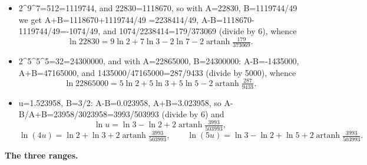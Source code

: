 \documentclass[10pt,reqno]{amsart}
\def\({}\def\){}%
\def\frac#1#2{#1/#2}%
\providecommand{\tightlist}{\setlength{\itemsep}{0pt}\setlength{\parskip}{0pt}}
\theoremstyle{definition}
\theoremstyle{remark}
\begin{document}
\begin{itemize}
\tightlist
\item
  \(2^9^7=512=1119744\), and \(22830=1118670\), so with \(A=22830\), \(B=\frac{1119744}{49}\) we get \(A+B=\frac{1118670+1119744}{49}
  =\frac{2238414}{49}\), \(A-B=\frac{1118670-1119744}{49}=-\frac{1074}{49}\), and \(\frac{1074}{2238414}=\frac{179}{373069}\) (divide by \(6\)), whence \[\ln 22830=9\ln2+7\ln3-2\ln7-2\operatorname{artanh}\tfrac{179}{373069}. \tag{5.5}\]
\item
  \(2^5^5^5=32=24300000\), and with \(A=22865000\), \(B=24300000\): \(A-B=-1435000\), \(A+B=47165000\), and \(\frac{1435000}{47165000}=\frac{287}{9433}\) (divide by \(5000\)), whence \[\ln 22865000=5\ln2+5\ln3+5\ln5-2\operatorname{artanh}\tfrac{287}{9433}. \tag{5.6}\]
\item
  \(u=1.523958\), \(B=\frac32\): \(A-B=0.023958\), \(A+B=3.023958\), so \(\frac{A-B}{A+B}=\frac{23958}{3023958}=\frac{3993}{503993}\) (divide by \(6\)) and \[\ln u=\ln3-\ln2+2\operatorname{artanh}\tfrac{3993}{503993},\] \[\ln(4u)=\ln2+\ln3+2\operatorname{artanh}\tfrac{3993}{503993},\qquad
  \ln(5u)=\ln3-\ln2+\ln5+2\operatorname{artanh}\tfrac{3993}{503993}. \tag{5.7}\]
\end{itemize}

\textbf{The three ranges.}
\end{document}
